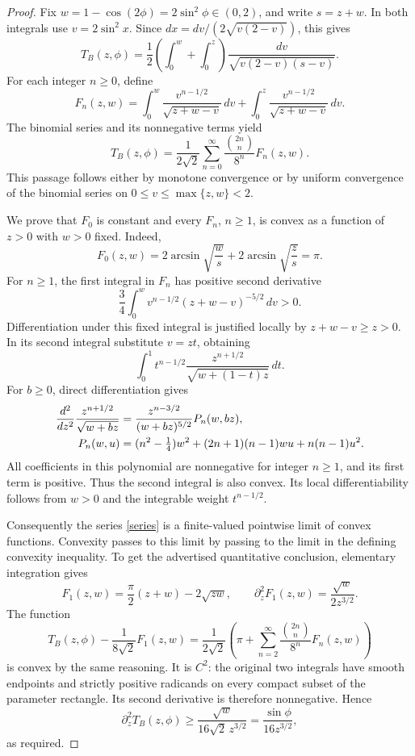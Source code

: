 \documentclass[11pt]{article}
\begin{document}
\begin{proof}
Fix \(w=1-\cos(2\phi)=2\sin^2\phi\in(0,2)\), and write \(s=z+w\).
In both integrals use \(v=2\sin^2x\). Since
\(dx=dv/(2\sqrt{v(2-v)})\), this gives
\begin{equation}\label{transform}
 T_B(z,\phi)=\frac12
 \left(\int_0^w+\int_0^z\right)
 \frac{dv}{\sqrt{v(2-v)(s-v)}}.
\end{equation}
For each integer \(n\geq0\), define
\[
 F_n(z,w)=
 \int_0^w\frac{v^{n-1/2}}{\sqrt{z+w-v}}\,dv+
 \int_0^z\frac{v^{n-1/2}}{\sqrt{z+w-v}}\,dv.
\]
The binomial series and its nonnegative terms yield
\begin{equation}\label{series}
 T_B(z,\phi)=\frac1{2\sqrt2}
       \sum_{n=0}^{\infty}\frac{\binom{2n}{n}}{8^n}F_n(z,w).
\end{equation}
This passage follows either by monotone convergence or by uniform
convergence of the binomial series on
\(0\leq v\leq\max\{z,w\}<2\).

We prove that \(F_0\) is constant and every \(F_n\), \(n\geq1\), is
convex as a function of \(z>0\) with \(w>0\) fixed.
Indeed,
\[
 F_0(z,w)=2\arcsin\sqrt{\frac{w}{s}}
             +2\arcsin\sqrt{\frac{z}{s}}=\pi.
\]
For \(n\geq1\), the first integral in \(F_n\) has positive second
derivative
\[
 \frac34\int_0^w
       v^{n-1/2}(z+w-v)^{-5/2}\,dv>0.
\]
Differentiation under this fixed integral is justified locally by
\(z+w-v\geq z>0\).
In its second integral substitute \(v=zt\), obtaining
\[
 \int_0^1 t^{n-1/2}
       \frac{z^{n+1/2}}{\sqrt{w+(1-t)z}}\,dt.
\]
For \(b\geq0\), direct differentiation gives
\begin{align}
 \frac{d^2}{dz^2}\frac{z^{n+1/2}}{\sqrt{w+bz}}
 &=\frac{z^{n-3/2}}{(w+bz)^{5/2}}P_n(w,bz),\label{kernel}\\
 P_n(w,u)&=
 (n^2-\tfrac14)w^2+(2n+1)(n-1)wu+n(n-1)u^2.\notag
\end{align}
All coefficients in this polynomial are nonnegative for integer
\(n\geq1\), and its first term is positive. Thus the second integral
is also convex. Its local differentiability follows from \(w>0\) and
the integrable weight \(t^{n-1/2}\).

Consequently the series \eqref{series} is a finite-valued pointwise
limit of convex functions. Convexity passes to this limit by passing
to the limit in the defining convexity inequality.
To get the advertised quantitative conclusion, elementary integration gives
\[
 F_1(z,w)=\frac{\pi}{2}(z+w)-2\sqrt{zw},
 \qquad
 \partial_z^2F_1(z,w)=\frac{\sqrt w}{2z^{3/2}}.
\]
The function
\[
 T_B(z,\phi)-\frac1{8\sqrt2}F_1(z,w)
  =\frac1{2\sqrt2}
       \left(\pi+\sum_{n=2}^{\infty}
                  \frac{\binom{2n}{n}}{8^n}F_n(z,w)\right)
\]
is convex by the same reasoning. It is \(C^2\): the original two
integrals have smooth endpoints and strictly positive radicands on
every compact subset of the parameter rectangle. Its second derivative
is therefore nonnegative. Hence
\[
 \partial_z^2T_B(z,\phi)\geq
       \frac{\sqrt w}{16\sqrt2\,z^{3/2}}
       =\frac{\sin\phi}{16z^{3/2}},
\]
as required.
\end{proof}
\end{document}
